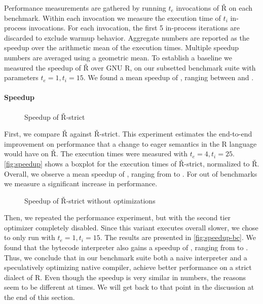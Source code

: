 \documentclass[review,nonacm,screen,acmsmall,anonymous=true]{acmart}
\renewcommand{\Rsh}{{\sf\v R}\xspace}
\newcommand{\Rshstrict}{{\sf\v R-strict}\xspace}
\begin{document}
Performance measurements are gathered by running $t_e$ invocations of \Rsh on
each benchmark. Within each invocation we measure the execution time of $t_i$
in-process invocations. For each invocation, the first 5 in-process iterations
are discarded to exclude warmup behavior. Aggregate numbers are reported as the
speedup over the arithmetic mean of the execution times. Multiple speedup
numbers are averaged using a geometric mean. To establish a baseline we measured
the speedup of \Rsh over GNU R, on our subsetted benchmark suite with parameters
$t_e = 1, t_i = 15$. We found a mean speedup of \speedupRsh, ranging between
\speedupRshMin and \speedupRshMax.

\paragraph{Speedup}

\begin{figure}[h]
  \centering
  
  \caption{Speedup of \Rshstrict}
  \label{fig:speedup}
\end{figure}

First, we compare \Rsh against \Rshstrict. This experiment estimates the end-to-end
improvement on performance that a change to eager semantics in the R language
would have on \Rsh. The execution times were measured with $t_e = 4, t_i = 25$.
\autoref{fig:speedup} shows a boxplot for the execution times of \Rsh-strict,
normalized to \Rsh. Overall, we observe a mean speedup of
\speedupRshStrict, ranging from \speedupRshStrictMin to \speedupRshStrictMax.
For \speedupRshStrictSignificant out of \benchmarkSuiteSize benchmarks we measure a significant increase in performance.
%
\begin{figure}[h]
  \centering
  
  \caption{Speedup of \Rshstrict without optimizations}
  \label{fig:speedup-bc}
\end{figure}
%
Then, we repeated the performance experiment, but with the second tier
optimizer completely disabled. Since this variant executes overall \rshBCSlowdown
slower, we chose to only run with $t_e = 1, t_i = 15$.
The results are presented in \autoref{fig:speedup-bc}. We found that the bytecode
interpreter also gains a speedup of \speedupBCRshStrict, ranging from
\speedupBCRshStrictMin to \speedupBCRshStrictMax.
%
Thus, we conclude that in our benchmark suite both a naive interpreter and a speculatively
optimizing native compiler, achieve better performance on a strict dialect of R.
Even though the speedup is very similar in numbers, the reasons seem to be
different at times. We will get back to that point in the discussion at the end of
this section.
\end{document}
